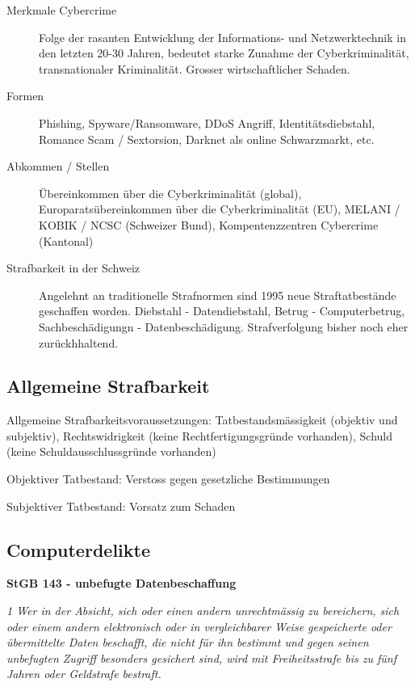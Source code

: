 \begin{description}
  \item[Merkmale Cybercrime] Folge der rasanten Entwicklung der Informations- und Netzwerktechnik in den letzten 20-30 Jahren, bedeutet starke Zunahme der Cyberkriminalität, transnationaler Kriminalität. Grosser wirtschaftlicher Schaden.
  \item[Formen] Phishing, Spyware/Ransomware, DDoS Angriff, Identitätsdiebstahl, Romance Scam / Sextorsion, Darknet als online Schwarzmarkt, etc.
  \item[Abkommen / Stellen] Übereinkommen über die Cyberkriminalität (global), Europaratsübereinkommen über die Cyberkriminalität (EU), MELANI / KOBIK / NCSC (Schweizer Bund), Kompentenzzentren Cybercrime (Kantonal)
  \item[Strafbarkeit in der Schweiz] Angelehnt an traditionelle Strafnormen sind 1995 neue Straftatbestände geschaffen worden. Diebstahl - Datendiebstahl, Betrug - Computerbetrug,  Sachbeschädigungn - Datenbeschädigung. Strafverfolgung bisher noch eher zurückhhaltend.
\end{description}

\subsection{Allgemeine Strafbarkeit}

Allgemeine Strafbarkeitsvoraussetzungen: Tatbestandsmässigkeit (objektiv und subjektiv), Rechtswidrigkeit (keine Rechtfertigungsgründe vorhanden), Schuld (keine Schuldausschlussgründe vorhanden)

Objektiver Tatbestand: Verstoss gegen gesetzliche Bestimmungen

Subjektiver Tatbestand: Vorsatz zum Schaden
\vspace{3mm}

\subsection{Computerdelikte}

\textbf{StGB 143 - unbefugte Datenbeschaffung}

\textit{1 Wer in der Absicht, sich oder einen andern unrechtmässig zu bereichern, sich oder einem andern elektronisch oder in vergleichbarer Weise gespeicherte oder übermittelte Daten beschafft, die nicht für ihn bestimmt und gegen seinen unbefugten Zugriff besonders gesichert sind, wird mit Freiheitsstrafe bis zu fünf Jahren oder Geldstrafe bestraft.}

